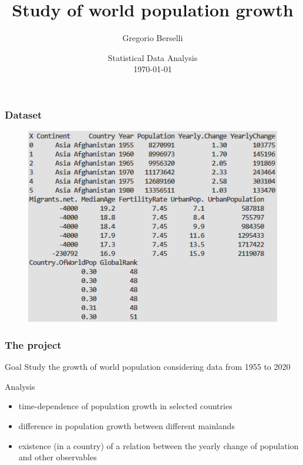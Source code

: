 \documentclass[
	11pt, %
]{beamer}
\title[Study of world population growth]{Study of world population growth} %
\author[Gregorio Berselli]{Gregorio Berselli} %
\institute[unibo]{University of Bologna \\ \smallskip \textit{gregorio.berselli@studio.unibo.it}} %
\date[\today]{Statistical Data Analysis \\ \today} %
\begin{document}

\begin{frame}
	\titlepage %
\end{frame}


\begin{frame}
	\frametitle{Dataset}
	\begin{figure}
		\includegraphics[width=.69\textwidth]{df.png}
	\end{figure}
\end{frame}

\begin{frame}
	\frametitle{The project}
	\begin{alertblock}{Goal}
		Study the growth of world population considering data from 1955 to 2020
	\end{alertblock}
	\begin{block}{Analysis}
		\begin{itemize}
			\item time-dependence of population growth in selected countries
			\item difference in population growth between different mainlands
			\item existence (in a country) of a relation between the yearly change of population and other observables
		\end{itemize}
	\end{block}
\end{frame}
\end{document}
